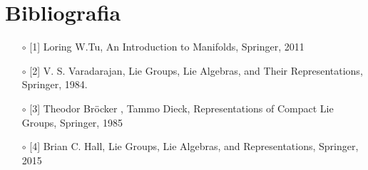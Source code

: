 \documentclass[12pt,a4paper]{report}
\theoremstyle{definition}
\theoremstyle{definition}
\theoremstyle{definition}
\theoremstyle{remark}
\begin{document}
\chapter*{Bibliografia}
\begin{itemize}
	\item[$\circ$] [1] Loring W.Tu, An Introduction to Manifolds, Springer, 2011
	\item[$\circ$] [2] V. S. Varadarajan, Lie Groups, Lie Algebras, and Their Representations, Springer,
	1984.
	\item[$\circ$] [3] Theodor Bröcker , Tammo Dieck, Representations of Compact Lie Groups, Springer, 1985
	\item[$\circ$] [4] Brian C. Hall, Lie Groups, Lie Algebras, and Representations, Springer, 2015
\end{itemize}
\end{document}
